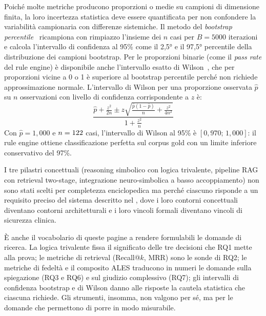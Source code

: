 Poiché molte metriche producono proporzioni o medie su campioni di dimensione
finita, la loro incertezza statistica deve essere quantificata per non
confondere la variabilità campionaria con differenze sistemiche. Il metodo
del \emph{bootstrap percentile}~\cite{efron1979bootstrap} ricampiona con
rimpiazzo l'insieme dei $n$ casi per $B = 5000$ iterazioni e calcola
l'intervallo di confidenza al 95\% come il 2,5° e il 97,5° percentile della
distribuzione dei campioni bootstrap. Per le proporzioni binarie (come il
\emph{pass rate} del rule engine) è disponibile anche l'intervallo esatto
di Wilson~\cite{wilson1927ci}, che per proporzioni vicine a 0 o 1 è
superiore al bootstrap percentile perché non richiede approssimazione normale.
L'intervallo di Wilson per una proporzione osservata $\hat{p}$ su $n$
osservazioni con livello di confidenza corrispondente a $z$ è:
\[
  \frac{\hat{p} + \frac{z^2}{2n} \pm z\sqrt{\frac{\hat{p}(1-\hat{p})}{n} + \frac{z^2}{4n^2}}}{1 + \frac{z^2}{n}}
\]
Con $\hat{p} = 1{,}000$ e $n = 122$ casi, l'intervallo di Wilson al 95\%
è $[0{,}970;\,1{,}000]$: il rule engine ottiene classificazione perfetta
sul corpus gold con un limite inferiore conservativo del 97\%.


I tre pilastri concettuali (reasoning simbolico con logica trivalente,
pipeline RAG con retrieval two-stage, integrazione neuro-simbolica a basso
accoppiamento) non sono stati scelti per completezza enciclopedica ma
perché ciascuno risponde a un requisito preciso del sistema descritto nel
, dove i loro contorni concettuali diventano contorni
architetturali e i loro vincoli formali diventano vincoli di sicurezza
clinica.

È anche il vocabolario di queste pagine a rendere formulabili le domande di
ricerca. La logica trivalente fissa il significato delle tre decisioni che RQ1
mette alla prova; le metriche di retrieval (Recall@$k$, MRR) sono le sonde di
RQ2; le metriche di fedeltà e il composito ALES traducono in numeri le domande
sulla spiegazione (RQ3 e RQ6) e sul giudizio complessivo (RQ7); gli intervalli
di confidenza bootstrap e di Wilson danno alle risposte la cautela statistica
che ciascuna richiede. Gli strumenti, insomma, non valgono per sé, ma per le
domande che permettono di porre in modo misurabile.
